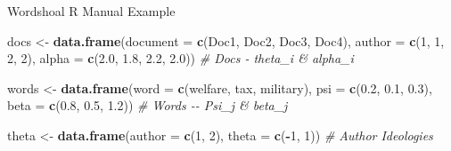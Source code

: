 \documentclass[
  ignorenonframetext,
  aspectratio=169]{beamer}
\newenvironment{Shaded}{\begin{snugshade}}{\end{snugshade}}
\newcommand{\AttributeTok}[1]{\textcolor[rgb]{0.13,0.29,0.53}{#1}}
\newcommand{\CommentTok}[1]{\textcolor[rgb]{0.56,0.35,0.01}{\textit{#1}}}
\newcommand{\DecValTok}[1]{\textcolor[rgb]{0.00,0.00,0.81}{#1}}
\newcommand{\FloatTok}[1]{\textcolor[rgb]{0.00,0.00,0.81}{#1}}
\newcommand{\FunctionTok}[1]{\textcolor[rgb]{0.13,0.29,0.53}{\textbf{#1}}}
\newcommand{\NormalTok}[1]{#1}
\newcommand{\OtherTok}[1]{\textcolor[rgb]{0.56,0.35,0.01}{#1}}
\newcommand{\SpecialCharTok}[1]{\textcolor[rgb]{0.81,0.36,0.00}{\textbf{#1}}}
\newcommand{\StringTok}[1]{\textcolor[rgb]{0.31,0.60,0.02}{#1}}
\begin{document}
\begin{frame}[fragile]{Wordshoal R Manual Example}
\label{wordshoal-r-manual-example}
\scriptsize

\begin{Shaded}
\begin{Highlighting}[]
\NormalTok{docs }\OtherTok{\textless{}{-}} \FunctionTok{data.frame}\NormalTok{(}\AttributeTok{document =} \FunctionTok{c}\NormalTok{(}\StringTok{\textquotesingle{}Doc1\textquotesingle{}}\NormalTok{, }\StringTok{\textquotesingle{}Doc2\textquotesingle{}}\NormalTok{, }\StringTok{\textquotesingle{}Doc3\textquotesingle{}}\NormalTok{, }\StringTok{\textquotesingle{}Doc4\textquotesingle{}}\NormalTok{), }
                   \AttributeTok{author   =} \FunctionTok{c}\NormalTok{(}\DecValTok{1}\NormalTok{, }\DecValTok{1}\NormalTok{, }\DecValTok{2}\NormalTok{, }\DecValTok{2}\NormalTok{), }
                   \AttributeTok{alpha    =} \FunctionTok{c}\NormalTok{(}\FloatTok{2.0}\NormalTok{, }\FloatTok{1.8}\NormalTok{, }\FloatTok{2.2}\NormalTok{, }\FloatTok{2.0}\NormalTok{)) }\CommentTok{\# Docs {-} theta\_i \& alpha\_i}

\NormalTok{words }\OtherTok{\textless{}{-}} \FunctionTok{data.frame}\NormalTok{(}\AttributeTok{word =} \FunctionTok{c}\NormalTok{(}\StringTok{\textquotesingle{}welfare\textquotesingle{}}\NormalTok{, }\StringTok{\textquotesingle{}tax\textquotesingle{}}\NormalTok{, }\StringTok{\textquotesingle{}military\textquotesingle{}}\NormalTok{), }
                    \AttributeTok{psi  =} \FunctionTok{c}\NormalTok{(}\FloatTok{0.2}\NormalTok{, }\FloatTok{0.1}\NormalTok{, }\FloatTok{0.3}\NormalTok{), }
                    \AttributeTok{beta =} \FunctionTok{c}\NormalTok{(}\FloatTok{0.8}\NormalTok{, }\FloatTok{0.5}\NormalTok{, }\FloatTok{1.2}\NormalTok{)) }\CommentTok{\# Words {-}{-} Psi\_j \& beta\_j}

\NormalTok{theta }\OtherTok{\textless{}{-}} \FunctionTok{data.frame}\NormalTok{(}\AttributeTok{author =} \FunctionTok{c}\NormalTok{(}\DecValTok{1}\NormalTok{, }\DecValTok{2}\NormalTok{),  }
                    \AttributeTok{theta  =} \FunctionTok{c}\NormalTok{(}\SpecialCharTok{{-}}\DecValTok{1}\NormalTok{, }\DecValTok{1}\NormalTok{)) }\CommentTok{\# Author Ideologies}



\end{Highlighting}
\end{Shaded}
\end{frame}
\end{document}
